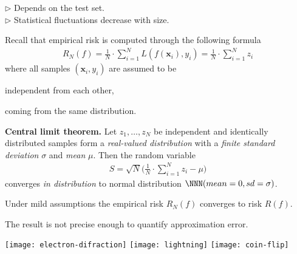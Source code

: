 \documentclass[landscape,footrule]{foils}
\renewcommand{\vec}[1]{\boldsymbol{#1}}
\begin{document}
\vspace*{-0.0cm}
$\triangleright$  Depends on the test set.\\
$\triangleright$  Statistical fluctuations decrease with size.




Recall that empirical risk is computed through the following formula
\begin{align*}
  R_N(f)=\frac{1}{N}\cdot\sum_{i=1}^N L(f(\vec{x}_i), y_i) = \frac{1}{N}\cdot\sum_{i=1}^N z_i
\end{align*} 
where all samples $(\vec{x}_i, y_i)$ are assumed to be
\begin{triangles}
\item independent from each other,
\item coming from the same distribution.
\end{triangles}


\textbf{Central limit theorem.}
Let $z_1, \ldots, z_N$ be independent and identically distributed samples form a \emph{real-valued distribution} with a \emph{finite standard deviation} $\sigma$ and \emph{mean} $\mu$. Then the random variable 
\begin{align*}
S=\sqrt{N}\Biggl(\frac{1}{N}\cdot \sum_{i=1}^N z_i -\mu\Biggr)
\end{align*}
converges \emph{in distribution} to normal distribution $\NNN(mean=0, sd=\sigma)$.  
\vspace{1ex}

\begin{triangles}
\item Under mild assumptions the empirical risk $R_N(f)$ converges to risk $R(f)$.
\item The result is not precise enough to quantify approximation error.
\end{triangles}




\begin{center}
\texttt{[image: electron-difraction]}\hspace*{0.5cm}
\texttt{[image: lightning]}\hspace*{0.5cm}
\texttt{[image: coin-flip]}
\end{center}
\vspace*{1cm}
\end{document}
